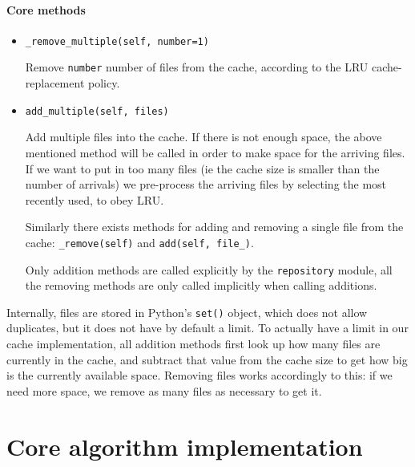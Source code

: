 \documentclass[12pt,twoside,notitlepage]{report}
\begin{document}
\paragraph{Core methods}
\begin{itemize}
\item \texttt{\_remove\_multiple(self, number=1)} 

Remove \texttt{number} number of files from the cache, according to the LRU cache-replacement policy.

\item \texttt{add\_multiple(self, files)}

Add multiple files into the cache. If there is not enough space,  the above mentioned method will be called in order to make space for the arriving files. If we want to put in too many files (ie the cache size is smaller than the number of arrivals) we pre-process the arriving files by selecting the most recently used, to obey LRU.

Similarly there exists methods for adding and removing a single file from the cache: \texttt{\_remove(self)} and \texttt{add(self, file\_)}. 

Only addition methods are called explicitly by the \texttt{repository} module, all the removing methods are only called implicitly when calling additions.
\end{itemize}
Internally, files are stored in Python's \texttt{set()} object, which does not allow duplicates, but it does not have by default a limit. To actually have a limit in our cache implementation, all addition methods first look up how many files are currently in the cache, and subtract that value from the cache size to get how big is the currently available space. Removing files works accordingly to this: if we need more space, we remove as many files as necessary to get it.
\section{Core algorithm implementation}
\end{document}
